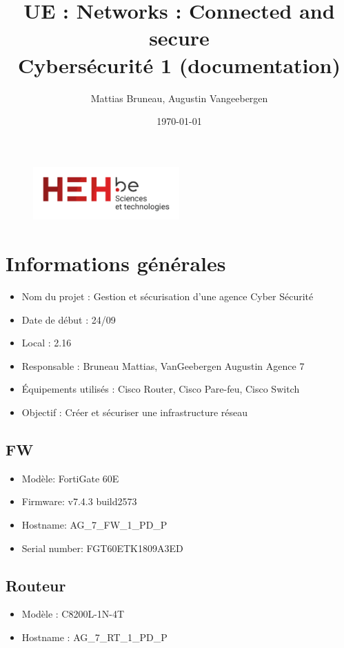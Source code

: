 \documentclass[a4paper,12pt]{article}
\title{UE : Networks : Connected and secure\\ \textbf{Cybersécurité 1 (documentation)}}
\author{Mattias Bruneau, Augustin Vangeebergen}
\date{\today}
\begin{document}
\maketitle
\begin{figure}[h]
\centering
\includegraphics[width=0.5\textwidth]{logo.png}
\label{fig:logoheh}
\end{figure}
\newpage

\tableofcontents
\newpage
\section{Informations générales}
\begin{itemize}
    \item Nom du projet : Gestion et sécurisation d'une agence Cyber Sécurité
    \item Date de début : 24/09
    \item Local : 2.16
    \item Responsable : Bruneau Mattias, VanGeebergen Augustin Agence 7
    \item Équipements utilisés : Cisco Router, Cisco Pare-feu, Cisco Switch 
    \item Objectif : Créer et sécuriser une infrastructure réseau
\end{itemize}

\subsection{FW}
\begin{itemize}
\item Modèle: FortiGate 60E
\item Firmware: v7.4.3 build2573
\item Hostname: AG\_7\_FW\_1\_PD\_P
\item Serial number: FGT60ETK1809A3ED
\end{itemize}
\subsection{Routeur}
\begin{itemize}
\item Modèle : C8200L-1N-4T
\item Hostname : AG\_7\_RT\_1\_PD\_P
\end{itemize}
\end{document}
